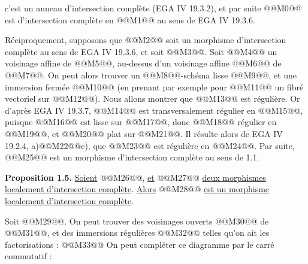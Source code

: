 
c'est un anneau d'intersection complète (EGA IV 19.3.2), et par suite @@M0@@ est d'intersection complète en @@M1@@ au sens de EGA IV 19.3.6.

Réciproquement, supposons que @@M2@@ soit un morphisme d'intersection complète au sens de EGA IV 19.3.6, et soit @@M3@@. Soit @@M4@@ un voisinage affine de @@M5@@, au-dessus d'un voisinage affine @@M6@@ de @@M7@@. On peut alors trouver un @@M8@@-schéma lisse @@M9@@, et une immersion fermée @@M10@@ (en prenant par exemple pour @@M11@@ un fibré vectoriel sur @@M12@@). Nous allons montrer que @@M13@@ est régulière. Or d'après EGA IV 19.3.7, @@M14@@ est transversalement régulier en @@M15@@, puisque @@M16@@ est lisse sur @@M17@@, donc @@M18@@ régulier en @@M19@@, et @@M20@@ plat sur @@M21@@. Il résulte alors de EGA IV 19.2.4, a)@@M22@@c), que @@M23@@ est régulière en @@M24@@. Par suite, @@M25@@ est un morphisme d'intersection complète au sens de 1.1.

\textbf{Proposition 1.5.} \uline{Soient} @@M26@@, \uline{et} @@M27@@ \uline{deux morphismes localement d'intersection complète}. \uline{Alors} @@M28@@ \uline{est un morphisme localement d'intersection complète}.

Soit @@M29@@. On peut trouver des voisinages ouverts @@M30@@ de @@M31@@, et des immersions régulières @@M32@@ telles qu'on ait les factorisations :
@@M33@@
On peut compléter ce diagramme par le carré commutatif :
